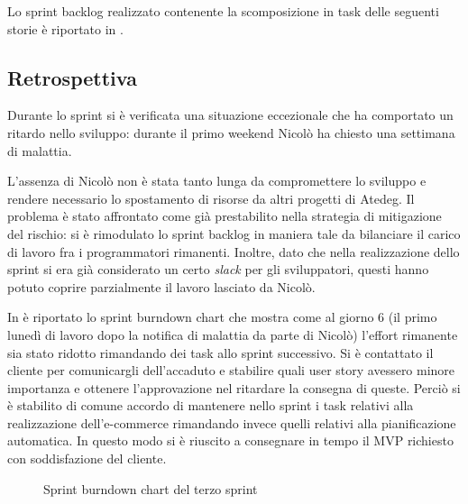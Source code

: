 Lo sprint backlog realizzato contenente la scomposizione in task delle seguenti storie è riportato in .

\subsection{Retrospettiva}
Durante lo sprint si è verificata una situazione eccezionale che ha comportato un ritardo nello sviluppo:
durante il primo weekend Nicolò ha chiesto una settimana di malattia.

L'assenza di Nicolò non è stata tanto lunga da compromettere lo sviluppo e rendere necessario lo spostamento di risorse da altri progetti di Atedeg.
Il problema è stato affrontato come già prestabilito nella strategia di mitigazione del rischio: si è rimodulato lo sprint backlog in maniera tale da bilanciare il carico di lavoro fra i programmatori rimanenti. Inoltre, dato che nella realizzazione dello sprint si era già considerato un certo \emph{slack} per gli sviluppatori, questi hanno potuto coprire parzialmente il lavoro lasciato da Nicolò.

In  è riportato lo sprint burndown chart che mostra come al giorno 6 (il primo lunedì di lavoro dopo la notifica di malattia da parte di Nicolò) l'effort rimanente sia stato ridotto rimandando dei task allo sprint successivo.
Si è contattato il cliente per comunicargli dell'accaduto e stabilire quali user story avessero minore importanza e ottenere l'approvazione nel ritardare la consegna di queste. Perciò si è stabilito di comune accordo di mantenere nello sprint i task relativi alla realizzazione dell'e-commerce rimandando invece quelli relativi alla pianificazione automatica.
In questo modo si è riuscito a consegnare in tempo il MVP richiesto con soddisfazione del cliente.

\begin{figure}[htp]
  \centering
  \caption{Sprint burndown chart del terzo sprint}
  \label{fig:burndown-sprint-3}
\end{figure}


